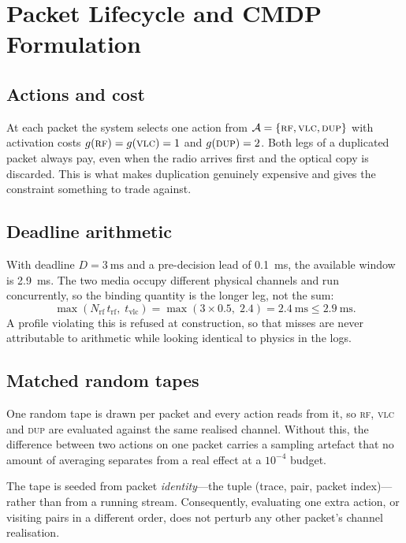 \documentclass[conference]{IEEEtran}
\begin{document}
\section{Packet Lifecycle and CMDP Formulation}
\label{sec:cmdp}

\subsection{Actions and cost}

At each packet the system selects one action from
$\mathcal{A}=\{\textsc{rf},\textsc{vlc},\textsc{dup}\}$ with activation costs
$g(\textsc{rf})=g(\textsc{vlc})=1$ and $g(\textsc{dup})=2$. Both legs of a
duplicated packet always pay, even when the radio arrives first and the
optical copy is discarded. This is what makes duplication genuinely expensive
and gives the constraint something to trade against.

\subsection{Deadline arithmetic}

With deadline $D=\SI{3}{\milli\second}$ and a pre-decision lead of
\SI{0.1}{\milli\second}, the available window is \SI{2.9}{\milli\second}. The
two media occupy different physical channels and run concurrently, so the
binding quantity is the longer leg, not the sum:
\begin{equation}
\max\!\left(N_{\mathrm{rf}}\,t_{\mathrm{rf}},\; t_{\mathrm{vlc}}\right)
= \max(3\times 0.5,\;2.4) = \SI{2.4}{\milli\second} \le \SI{2.9}{\milli\second}.
\end{equation}
A profile violating this is refused at construction, so that misses are never
attributable to arithmetic while looking identical to physics in the logs.

\subsection{Matched random tapes}

One random tape is drawn per packet and every action reads from it, so
\textsc{rf}, \textsc{vlc} and \textsc{dup} are evaluated against the same
realised channel. Without this, the difference between two actions on one
packet carries a sampling artefact that no amount of averaging separates from
a real effect at a $10^{-4}$ budget.

The tape is seeded from packet \emph{identity}---the tuple (trace, pair,
packet index)---rather than from a running stream. Consequently, evaluating
one extra action, or visiting pairs in a different order, does not perturb any
other packet's channel realisation.
\end{document}
